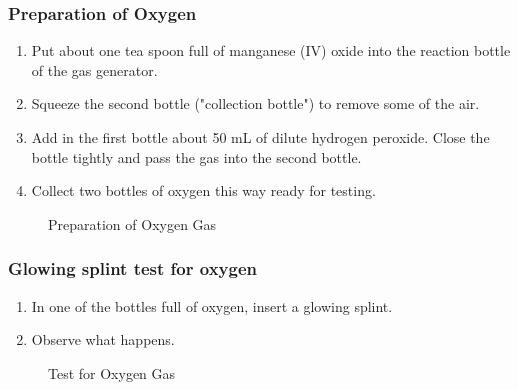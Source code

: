 \subsubsection*{Preparation of Oxygen}
\begin{enumerate}
\item{Put about one tea spoon full of manganese (IV) oxide into the reaction bottle of the gas generator.}
\item{Squeeze the second bottle ("collection bottle") to remove some of the air.}
\item{Add in the first bottle about 50 mL of dilute hydrogen peroxide. Close the bottle tightly and pass the gas into the second bottle.}
\item{Collect two bottles of oxygen this way ready for testing.}
\end{enumerate}
\begin{figure}[h]
\begin{center}
\def\svgwidth{250pt}

\caption{Preparation of Oxygen Gas}
\label{fig:oxygen-prep}
\end{center}
\end{figure}

\subsubsection*{Glowing splint test for oxygen}
\begin{enumerate}
\item{In one of the bottles full of oxygen, insert a glowing splint.}
\item{Observe what happens.}
\end{enumerate}

\begin{figure}[h]
\begin{center}
\def\svgwidth{50pt}

\caption{Test for Oxygen Gas}
\label{fig:glowing-splint_oxygen-test}
\end{center}
\end{figure}

